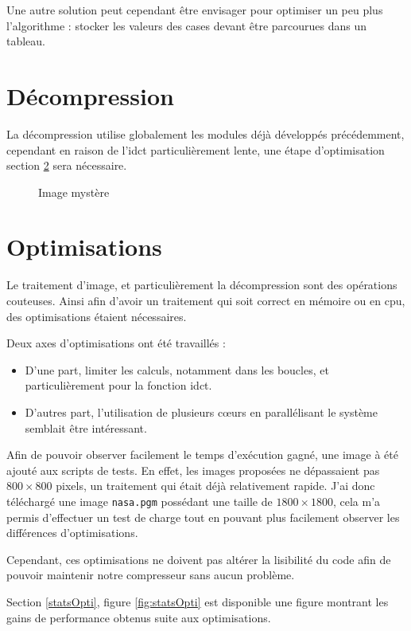 \documentclass[a4paper, 11pt]{article}
\begin{document}
	Une autre solution peut cependant être envisager pour optimiser un peu plus l'algorithme : stocker les valeurs des cases devant être parcourues dans un
	tableau.

	\section{Décompression}
	La décompression utilise globalement les modules déjà développés précédemment, cependant en raison de l'idct particulièrement lente, une étape d'optimisation
	section \ref{opti} sera nécessaire.

	\begin{figure}[H]
		\centering
		\caption{Image mystère}
	\end{figure}

	\section{Optimisations}\label{opti}
	Le traitement d'image, et particulièrement la décompression sont des opérations couteuses. Ainsi afin d'avoir un traitement qui soit correct en mémoire
	ou en cpu, des optimisations étaient nécessaires. 

	Deux axes d'optimisations ont été travaillés : 
	\begin{itemize}
		\item D'une part, limiter les calculs, notamment dans les boucles, et particulièrement pour la fonction idct. 
		\item D'autres part, l'utilisation de plusieurs cœurs en parallélisant le système semblait être intéressant.
	\end{itemize}
	
	Afin de pouvoir observer facilement le temps d'exécution gagné, une image à été ajouté aux scripts de tests. En effet, les images proposées ne dépassaient
	pas $800\times800$ pixels, un traitement qui était déjà relativement rapide. J'ai donc téléchargé une image \texttt{nasa.pgm} possédant une taille de
	$1800\times1800$, cela m'a permis d'effectuer un test de charge tout en pouvant plus facilement observer les différences d'optimisations.

	\begin{remarque}
	Cependant, ces optimisations ne doivent pas altérer la lisibilité du code afin de pouvoir maintenir notre compresseur sans aucun problème.
	\end{remarque}

	Section \ref{statsOpti}, figure \ref{fig:statsOpti} est disponible une figure montrant les gains de performance obtenus suite aux optimisations.
	
\end{document}
